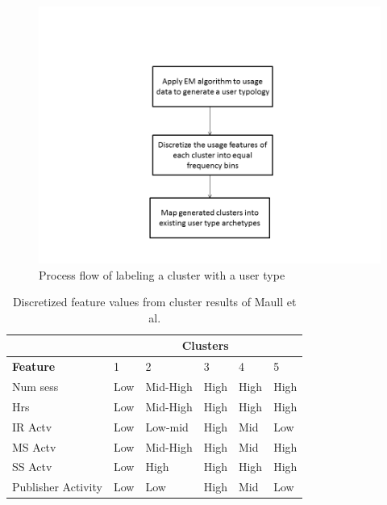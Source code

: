 \documentclass{acm_proc_article-sp}
\begin{document}
\begin{figure}
\centering
\includegraphics[width=1 \linewidth]{./process_flow}
\caption{Process flow of labeling a cluster with a user type}
\label{fig:process_flow}
\end{figure}

\begin{table}
\caption{Discretized feature values from cluster results of Maull et al. \cite{maullunderstanding}}
\label{maull_features}
\begin{tabular}{|l|l|l|l|l|l|}
\hline
& \multicolumn{5}{c|}{\textbf{Clusters}}  \\ \hline
\textbf{Feature} & 1 & 2 & 3 & 4 & 5 \\ \hline
Num sess & Low & Mid-High & High & High & High \\ \hline
Hrs & Low & Mid-High & High & High & High \\ \hline
IR Actv & Low & Low-mid & High & Mid & Low \\ \hline
MS Actv & Low & Mid-High & High & Mid & High \\ \hline
SS Actv & Low & High & High & High & High \\ \hline
Publisher Activity & Low & Low & High & Mid & Low \\ \hline
\end{tabular}
\end{table}
\end{document}

